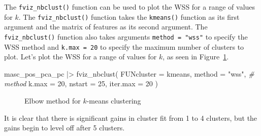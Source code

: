 \documentclass[
  letterpaper,
  krantz1]{latex/krantz-mod}
\newenvironment{Shaded}{\begin{snugshade}}{\end{snugshade}}
\newcommand{\AttributeTok}[1]{\textcolor[rgb]{0.00,0.00,0.00}{#1}}
\newcommand{\CommentTok}[1]{\textcolor[rgb]{0.00,0.00,0.00}{\textit{#1}}}
\newcommand{\DecValTok}[1]{\textcolor[rgb]{0.00,0.00,0.00}{#1}}
\newcommand{\FunctionTok}[1]{\textcolor[rgb]{0.00,0.00,0.00}{#1}}
\newcommand{\NormalTok}[1]{\textcolor[rgb]{0.00,0.00,0.00}{#1}}
\newcommand{\SpecialCharTok}[1]{\textcolor[rgb]{0.00,0.00,0.00}{#1}}
\newcommand{\StringTok}[1]{\textcolor[rgb]{0.00,0.00,0.00}{#1}}
\theoremstyle{definition}
\theoremstyle{definition}
\theoremstyle{remark}
\begin{document}
The \texttt{fviz\_nbclust()} function can be used to plot the WSS for a
range of values for \(k\). The \texttt{fviz\_nbclust()} function takes
the \texttt{kmeans()} function as its first argument and the matrix of
features as its second argument. The \texttt{fviz\_nbclust()} function
also takes arguments \texttt{method\ =\ "wss"} to specify the WSS method
and \texttt{k.max\ =\ 20} to specify the maximum number of clusters to
plot. Let's plot the WSS for a range of values for \(k\), as seen in
Figure~\ref{fig-explore-masc-pos-kmeans-elbow}.

\begin{Shaded}
\begin{Highlighting}[numbers=left,,]
\NormalTok{masc\_pos\_pca\_pc }\SpecialCharTok{|\textgreater{}}
  \FunctionTok{fviz\_nbclust}\NormalTok{(}
    \AttributeTok{FUNcluster =}\NormalTok{ kmeans,}
    \AttributeTok{method =} \StringTok{"wss"}\NormalTok{, }\CommentTok{\# method}
    \AttributeTok{k.max =} \DecValTok{20}\NormalTok{,}
    \AttributeTok{nstart =} \DecValTok{25}\NormalTok{,}
    \AttributeTok{iter.max =} \DecValTok{20}
\NormalTok{  )}
\end{Highlighting}
\end{Shaded}

\begin{figure}[!htb]


\caption{\label{fig-explore-masc-pos-kmeans-elbow}Elbow method for
\(k\)-means clustering}

\end{figure}%

It is clear that there is significant gains in cluster fit from 1 to 4
clusters, but the gains begin to level off after 5 clusters.
\end{document}
